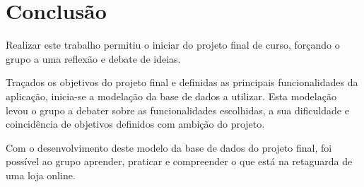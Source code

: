 \section{Conclusão} \label{section: Conclusao}

Realizar este trabalho permitiu o iniciar do projeto final de curso, 
forçando o grupo a uma reflexão e debate de ideias.
\par \vspace{6pt}
Traçados os objetivos do projeto final e definidas as principais funcionalidades 
da aplicação, inicia-se a modelação da base de dados a utilizar. Esta modelação 
levou o grupo a debater sobre as funcionalidades escolhidas, 
a sua dificuldade e coincidência de objetivos definidos com ambição do projeto.
\par \vspace{6pt}
Com o desenvolvimento deste modelo da base de dados do projeto final, foi possível 
ao grupo aprender, praticar e compreender o que está na retaguarda de uma loja online.
